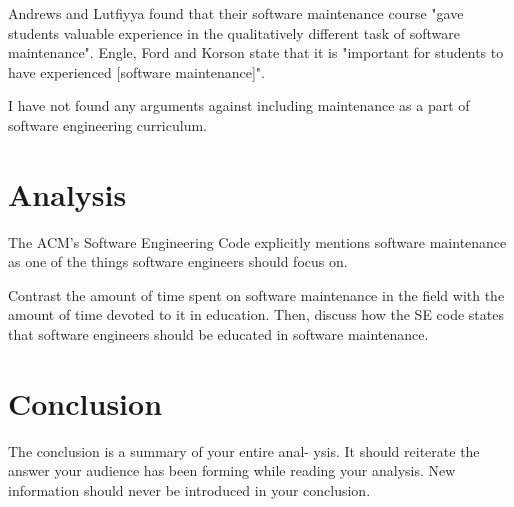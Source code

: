 \documentclass[11pt]{article}
\begin{document}
\begin{multicols}{2}
Andrews and Lutfiyya found that their software maintenance course "gave students valuable experience in the qualitatively different task of software maintenance". \cite{Andrews:2000:ERS:794188.794320}  Engle, Ford and Korson state that it is "important for students to have experienced [software maintenance]". \cite{engle}

I have not found any arguments against including maintenance as a part of software engineering curriculum.

\section{Analysis}

The ACM's Software Engineering Code explicitly mentions software maintenance as one of the things software engineers should focus on. \cite{secode}

Contrast the amount of time spent on software maintenance in the field with the amount of time devoted to it in education.  Then, discuss how the SE code states that software engineers should be educated in software maintenance.

\section{Conclusion}
The conclusion is a summary of your entire anal- ysis. It should reiterate the answer your audience has been forming while reading your analysis. New information should never be introduced in your conclusion. \cite{texTemp}

\end{multicols}
\newpage

\nocite{*}




\end{document}
